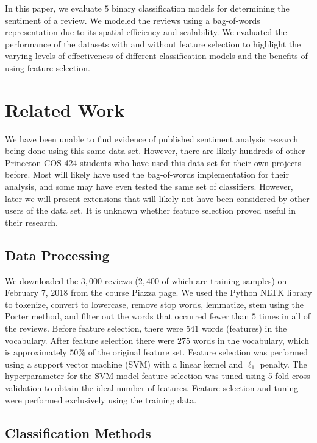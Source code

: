 \documentclass{article} %
\begin{document}
In this paper, we evaluate $5$ binary classification models for determining the sentiment of a review. We modeled the reviews using a bag-of-words representation due to its spatial efficiency and scalability. We evaluated the performance of the datasets with and without feature selection to highlight the varying levels of effectiveness of different classification models and the benefits of using feature selection.

\section{Related Work}
We have been unable to find evidence of published sentiment analysis research being done using this same data set. However, there are likely hundreds of other Princeton COS 424 students who have used this data set for their own projects before. Most will likely have used the bag-of-words implementation for their analysis, and some may have even tested the same set of classifiers. However, later we will present extensions that will likely not have been considered by other users of the data set. It is unknown whether feature selection proved useful in their research.

\subsection{Data Processing}

We downloaded the $3,000$ reviews ($2,400$ of which are training samples) on February 7, 2018 from the course Piazza page. We used the Python NLTK library to tokenize, convert to lowercase, remove stop words, lemmatize, stem using the Porter method, and filter out the words that occurred fewer than $5$ times in all of the reviews. Before feature selection, there were $541$ words (features) in the vocabulary. After feature selection there were $275$ words in the vocabulary, which is approximately $50\%$ of the original feature set. Feature selection was performed using a support vector machine (SVM) with a linear kernel and $\ell_1$ penalty. The hyperparameter for the SVM model feature selection was tuned using 5-fold cross validation to obtain the ideal number of features. Feature selection and tuning were performed exclusively using the training data.

\subsection{Classification Methods}
\end{document}
